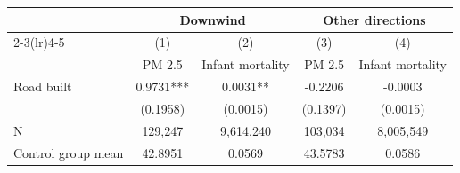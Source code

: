 {
\def\sym#1{\ifmmode^{#1}\else\(^{#1}\)\fi}
\begin{tabular}{l*{4}{c}}
\hline\hline
                         &\multicolumn{2}{c}{Downwind}   &\multicolumn{2}{c}{Other directions}\\\cmidrule(lr){2-3}\cmidrule(lr){4-5}
                         &\multicolumn{1}{c}{(1)}&\multicolumn{1}{c}{(2)}&\multicolumn{1}{c}{(3)}&\multicolumn{1}{c}{(4)}\\
                         &\multicolumn{1}{c}{PM 2.5}&\multicolumn{1}{c}{Infant mortality}&\multicolumn{1}{c}{PM 2.5}&\multicolumn{1}{c}{Infant mortality}\\
\hline
Road built               &      0.9731***&      0.0031** &     -0.2206   &     -0.0003   \\
                         &    (0.1958)   &    (0.0015)   &    (0.1397)   &    (0.0015)   \\
\hline
N                        &     129,247   &   9,614,240   &     103,034   &   8,005,549   \\
Control group mean       &     42.8951   &      0.0569   &     43.5783   &      0.0586   \\
\hline\hline
\end{tabular}
}
